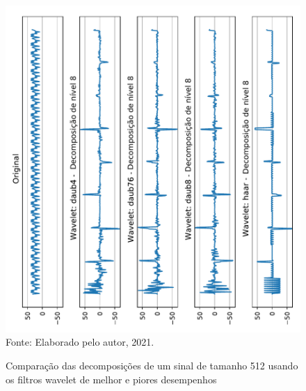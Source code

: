 	\begin{figure}[h]
		\centering
		\caption{Comparação das decomposições de um sinal de tamanho 512 usando os filtros wavelet de melhor e piores desempenhos }
		\includegraphics[width=.93\linewidth,angle=-90]{images/results/haarDaubComparison/haarDaub42Comparison}
		\label{fig:haardaub42comparison}
		\\Fonte: Elaborado pelo autor, 2021.
	\end{figure}
	
